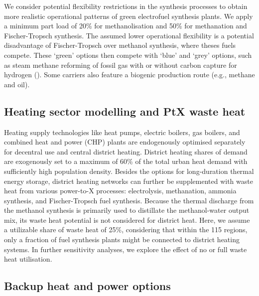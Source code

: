 We consider potential flexibility restrictions in the synthesis processes to
obtain more realistic operational patterns of green electrofuel synthesis
plants. We apply a minimum part load of 20\% for methanolisation and 50\% for
methanation and Fischer-Tropsch
synthesis.\cite{mucciPowerXProcessesBased2023,wentrupDynamicOperationFischerTropsch2022,dieterichPowerliquidSynthesisMethanol2020,mbathaPowermethanolProcessReview2021}
The assumed lower operational flexibility is a potential disadvantage of
Fischer-Tropsch over methanol synthesis, where theses fuels compete. These
`green' options then compete with `blue' and `grey' options, such as steam
methane reforming of fossil gas with or without carbon capture for hydrogen
(). Some carriers also feature a
biogenic production route (e.g., methane and oil).

\subsection*{Heating sector modelling and PtX waste heat}
\label{sec:methods-heating}

Heating supply technologies like heat pumps, electric boilers, gas boilers, and
combined heat and power (CHP) plants are endogenously optimised separately for
decentral use and central district heating. District heating shares of demand
are exogenously set to a maximum of 60\% of the total urban heat demand with
sufficiently high population density. Besides the options for long-duration
thermal energy storage, district heating networks can further be supplemented
with waste heat from various power-to-X processes: electrolysis, methanation,
ammonia synthesis, and Fischer-Tropsch fuel synthesis. Because the thermal
discharge from the methanol synthesis is primarily used to distillate the
methanol-water output mix,\cite{brownUltralongdurationEnergyStorage2023} its
waste heat potential is not considered for district heat. Here, we assume a
utilizable share of waste heat of 25\%, considering that within the 115 regions,
only a fraction of fuel synthesis plants might be connected to district heating
systems. In further sensitivity analyses, we explore the effect of no or full
waste heat utilisation.

\subsection*{Backup heat and power options}
\label{sec:methods-backup}

